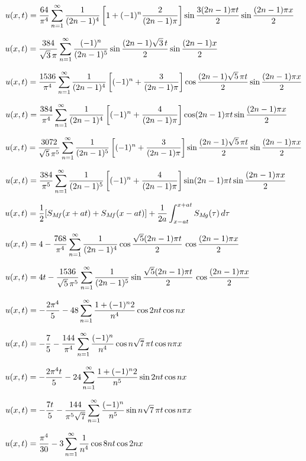 $u(x,t)
=\displaystyle\frac{64}{\pi^4}\sum_{n=1}^\infty
\frac{1}{(2n-1)^4}\left[1+(-1)^n\frac{2}{(2n-1)\pi}\right]
\sin\frac{3(2n-1)\pi t}{2}
\sin\frac{(2n-1)\pi x}{2}$


$u(x,t)=\displaystyle\frac{384}{\sqrt3\,\pi}\sum_{n=1}^\infty\frac{(-1)^n}{(2n-1)^5}
\sin\frac{(2n-1)\sqrt3\,t}{2}\sin\frac{(2n-1) x}{2}$


$u(x,t)=\displaystyle\frac{1536}{\pi^4}\sum_{n=1}^\infty\frac{1}{(2n-1)^4}
\left[(-1)^n+\frac{3}{(2n-1)\pi}\right]
\cos\frac{(2n-1)\sqrt5\,\pi t}{2}\sin\frac{(2n-1)\pi x}{2}$

$u(x,t)=\displaystyle\frac{384}{\pi^4}\sum_{n=1}^\infty\frac{1}{(2n-1)^4}
\left[(-1)^n+\frac{4}{(2n-1)\pi}\right]\cos(2n-1)\pi
t\sin\frac{(2n-1)\pi x}{2}$

$u(x,t)=\displaystyle\frac{3072}{\sqrt5\,\pi^5}\sum_{n=1}^\infty\frac{1}{(2n-1)^5}
\left[(-1)^n+\frac{3}{(2n-1)\pi}\right]
\sin\frac{(2n-1)\sqrt5\,\pi t}{2}\sin\frac{(2n-1)\pi x}{2}$




$u(x,t)=\displaystyle\frac{384}{\pi^5}\sum_{n=1}^\infty\frac{1}{(2n-1)^5}
\left[(-1)^n+\frac{4}{(2n-1)\pi}\right]\sin(2n-1)\pi
t\sin\frac{(2n-1)\pi x}{2}$

$\displaystyle u(x,t)=\frac{1}{2}[S_{M\!f}(x+at)+S_{M\!f}(x-at)]+
\frac{1}{2a}\int_{x-at}^{x+at}S_{M\!g}(\tau)\,d\tau$


$u(x,t)=\displaystyle4-\frac{768}{\pi^4}\sum_{n=1}^\infty\frac{1}{(2n-1)^4}\cos\frac{\sqrt5(2n-1)\pi t}{2}\,\cos\frac{(2n-1)\pi x}{2}$

$u(x,t)=\displaystyle4t-\frac{1536}{\sqrt5\,\pi^5}\sum_{n=1}^\infty\frac{1}{(2n-1)^5}\sin\frac{\sqrt5(2n-1)\pi t}{2}\,\cos\frac{(2n-1)\pi x}{2}$

$u(x,t)=\displaystyle-\frac{2\pi^4}{5}-48\sum_{n=1}^\infty\frac{1+(-1)^n2}{n^4}\cos2nt\cos nx$

$u(x,t)=\displaystyle-\frac{7}{5}-\frac{144}{\pi^4}\sum_{n=1}^\infty\frac{(-1)^n}{n^4}\cos n\sqrt7\,\pi t\cos n\pi x$

$u(x,t)=\displaystyle-\frac{2\pi^4t}{5}-24\sum_{n=1}^\infty\frac{1+(-1)^n2}{n^5}\sin2n t\cos nx$

$u(x,t)=\displaystyle-\frac{7t}{5}-\frac{144}{\pi^5\sqrt7}\sum_{n=1}^\infty\frac{(-1)^n}{n^5}\sin n\sqrt7\,\pi t\cos n\pi x$

$u(x,t)=\displaystyle{\frac{\pi^4}{30}-3\sum_{n=1}^\infty\frac{1}{n^4}\cos8nt\cos2nx}$

